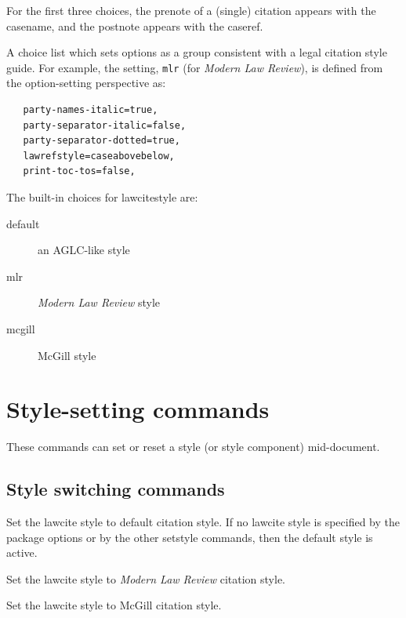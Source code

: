 For the first three choices, the prenote of a (single) citation appears with the casename, and the postnote appears with the caseref.
\bigskip



A choice list which sets options as a group consistent with a legal citation style guide. For example, the setting, \texttt{mlr} (for \textit{Modern Law Review}), is defined from the option-setting perspective as:

\begin{verbatim}
   party-names-italic=true,
   party-separator-italic=false,
   party-separator-dotted=true,
   lawrefstyle=caseabovebelow,
   print-toc-tos=false,
\end{verbatim}	
	
The built-in choices for lawcitestyle are:

\begin{description}
\item[default] an AGLC-like style
\item[mlr] \textit{Modern Law Review} style
\item[mcgill] McGill style
\end{description}	
	
	
\section{Style-setting commands}
These commands can set or reset a style (or style component) mid-document.

\subsection{Style switching commands}


Set the lawcite style to default citation style. If no lawcite style is specified by the package options or by the other setstyle commands, then the default style is active.
\bigskip
	

Set the lawcite style to \textit{Modern Law Review} citation style. 
\bigskip
	

Set the lawcite style to McGill citation style. 
\bigskip
	



